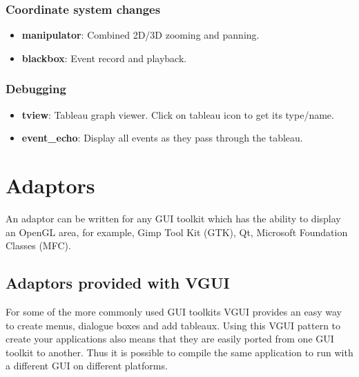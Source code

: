 \documentclass[12pt]{report} \usepackage{epsfig}
\begin{document}
\subsection{Coordinate system changes}
\begin{itemize}
\item {\bf manipulator}: Combined 2D/3D zooming and panning.
\item {\bf blackbox}: Event record and playback.
\end{itemize}

\subsection{Debugging}
\begin{itemize}
\item {\bf tview}: Tableau graph viewer. Click on tableau icon to get its type/name.
\item {\bf event\_echo}:  Display all events as they pass through the tableau.
\end{itemize}

\chapter{Adaptors}

An adaptor can be written for any GUI toolkit which has the ability to display an
OpenGL area, for example, Gimp Tool Kit (GTK), Qt, Microsoft Foundation Classes (MFC).

\section{Adaptors provided with VGUI}

For some of the more commonly used GUI toolkits VGUI provides an easy way to create menus,
dialogue boxes and add tableaux.  Using this VGUI pattern to create your
applications also means that they are easily ported from one GUI toolkit to
another. Thus it is possible to compile the same application to run with a different GUI on
different platforms.
\end{document}
